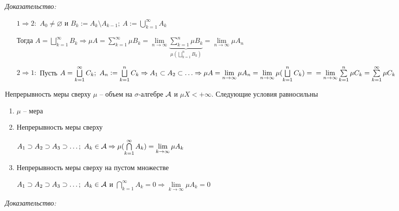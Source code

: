 \documentclass[12pt]{article}
\begin{document}
\textit{Доказательство:}

\begin{itemize}
    \item[$1 \Rightarrow 2 :$] $A_0 \neq \varnothing$ и $B_k := A_k \setminus A_{k - 1};\ A := \bigcup\limits_{k = 1}^\infty A_k$
    
    Тогда $A = \bigsqcup\limits_{k = 1}^\infty B_k \Rightarrow \mu A = \sum\limits_{k = 1}^\infty \mu B_k = \lim\limits_{n \to \infty} \underbrace{\sum\limits_{k = 1}^n \mu B_k}_{\mu(\bigsqcup\limits_{k = 1}^n B_k)} = \lim\limits_{n \to \infty} \mu A_n$

    \item[$2 \Rightarrow 1 :$] Пусть $A = \bigsqcup\limits_{k = 1}^\infty C_k;\ A_n := \bigsqcup\limits_{k = 1}^n C_k \Rightarrow A_1 \subset A_2 \subset \ldots \Rightarrow \mu A = \lim\limits_{n \to \infty} \mu A_n = \lim\limits_{n \to \infty} \mu(\bigsqcup\limits_{k = 1}^n C_k) = \\ = \lim\limits_{n \to \infty} \sum\limits_{k = 1}^n \mu C_k = \sum\limits_{k = 1}^\infty \mu C_k$
\end{itemize}

\begin{theo}{Непрерывность меры сверху}
    $\mu$ -- объем на $\sigma$-алгебре $\mathcal{A}$ и $\mu X < + \infty$. Следующие условия равносильны 

    \begin{enumerate}
        \item $\mu$ -- мера 
        \item Непрерывность меры сверху
        
        $A_1 \supset A_2 \supset A_3 \supset \ldots;\ A_k \in \mathcal{A} \Rightarrow \mu(\bigcap\limits_{k = 1}^\infty A_k) = \lim\limits_{k \to \infty} \mu A_k$
        \item Непрерывность меры сверху на пустом множестве
        
        $A_1 \supset A_2 \supset A_3 \supset \ldots;\ A_k \in \mathcal{A}$ и $\bigcap\limits_{k = 1}^\infty A_k = 0 \Rightarrow \lim\limits_{k \to \infty} \mu A_k = 0$
    \end{enumerate}
\end{theo}

\textit{Доказательство:}
\end{document}
